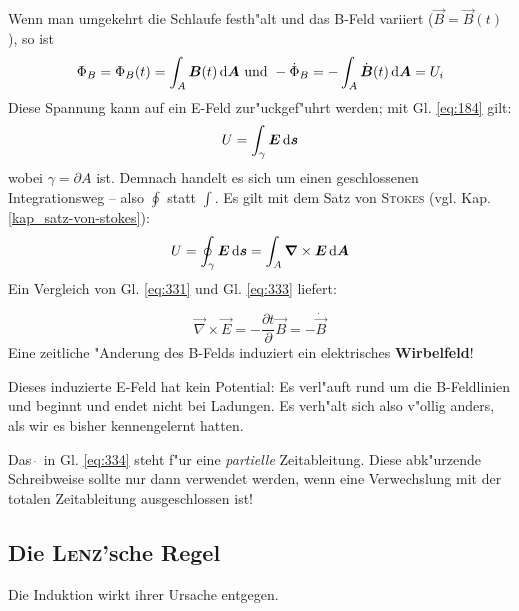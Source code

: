 Wenn man umgekehrt die Schlaufe festh"alt und das B-Feld variiert
($\vec B = \vec B(t)$), so ist
\begin{equation}
\label{eq:331}
   \Phi_B = \Phi_B(t) = \int_A \boldsymbol{B}(t) \, \mathrm{d} \boldsymbol{A} \text{ und } - \dot \Phi_B = -
   \int_A \dot {\boldsymbol{B}}(t) \, \mathrm{d} \boldsymbol{A} = U_i
\end{equation}
Diese Spannung kann auf ein E-Feld zur"uckgef"uhrt werden; mit
Gl. \eqref{eq:184} gilt:
\begin{equation}
   \label{eq:332}
   U = \int_\gamma \boldsymbol{E} \, \mathrm{d} \boldsymbol{s}
\end{equation}
wobei $\gamma = \partial A$ ist. Demnach handelt es sich um einen
geschlossenen Integrationsweg -- also $\oint$ statt $\int$. Es gilt
mit dem Satz von \textsc{Stokes}
(vgl. Kap. \ref{kap_satz-von-stokes}):
\begin{equation}
   \label{eq:333}
  U = \oint_\gamma \boldsymbol{E} \, \mathrm{d} \boldsymbol{s} = \int_A \boldsymbol{\nabla} \times \boldsymbol{E}
   \, \mathrm{d} \boldsymbol{A}
\end{equation}
Ein Vergleich von Gl. \eqref{eq:331} und Gl. \eqref{eq:333} liefert:
\begin{Wichtig}
   \begin{equation}
      \label{eq:334}
      \vec \nabla \times \vec E = - \frac{\partial t}{\partial }{\vec
        B} = - \dot{\vec B}
   \end{equation}
   Eine zeitliche "Anderung des B-Felds induziert ein elektrisches
   \textbf{Wirbelfeld}!
\end{Wichtig}
Dieses induzierte E-Feld hat kein Potential: Es verl"auft rund um die
B-Feldlinien und beginnt und endet nicht bei Ladungen. Es verh"alt sich
also v"ollig anders, als wir es bisher kennengelernt hatten.

Das $\dot ~$ in Gl. \eqref{eq:334} steht f"ur eine \emph{partielle}
Zeitableitung. Diese abk"urzende Schreibweise sollte nur dann
verwendet werden, wenn eine Verwechslung mit der totalen Zeitableitung
ausgeschlossen ist!






\subsection{Die \textsc{Lenz}'sche Regel}
\label{kap_lenzsche-regel}

\begin{Wichtig}
\label{wichtig_lenzsche_regel}
   Die Induktion wirkt ihrer Ursache entgegen.
\end{Wichtig}

